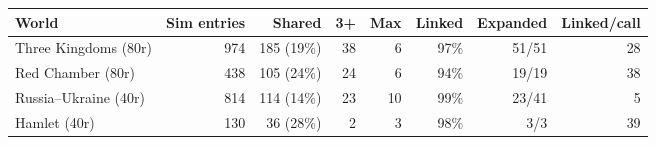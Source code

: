 \begin{tabular}{lrrrrrrr}
\toprule
World & Sim entries & Shared & 3+ & Max & Linked & Expanded & Linked/call \\
\midrule
Three Kingdoms (80r) & 974 & 185 (19\%) & 38 & 6 & 97\% & 51/51 & 28 \\
Red Chamber (80r) & 438 & 105 (24\%) & 24 & 6 & 94\% & 19/19 & 38 \\
Russia--Ukraine (40r) & 814 & 114 (14\%) & 23 & 10 & 99\% & 23/41 & 5 \\
Hamlet (40r) & 130 & 36 (28\%) & 2 & 3 & 98\% & 3/3 & 39 \\
\bottomrule
\end{tabular}
